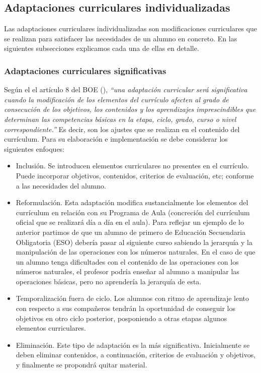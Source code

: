 \subsection{Adaptaciones curriculares individualizadas}

Las adaptaciones curriculares individualizadas son modificaciones curriculares que se realizan para satisfacer las necesidades de un alumno en concreto. En las siguientes subsecciones explicamos cada una de ellas en detalle.

\subsubsection{Adaptaciones curriculares significativas}
Según el el artículo 8 del BOE (\citeyear[p. 7]{BOE}), \textit{``una adaptación curricular será significativa cuando la modificación de los elementos del currículo afecten al grado de consecución de los objetivos, los contenidos y los aprendizajes imprescindibles que determinan las competencias básicas en la etapa, ciclo, grado, curso o nivel correspondiente.''} Es decir, son los ajustes que se realizan en el contenido del currículum. Para su elaboración e implementación se debe considerar los siguientes enfoques:
\begin{itemize}
    \item Inclusión. Se introducen elementos curriculares no presentes en el currículo. Puede incorporar objetivos, contenidos, criterios de evaluación, etc; conforme a las necesidades del alumno.
    \item Reformulación. Esta adaptación modifica sustancialmente los elementos del currículum en relación con su Programa de Aula (concreción del currículum oficial que se realizará día a día en el aula). Para reflejar un ejemplo de lo anterior partimos de que un alumno de primero de Educación Secuendaria Obligatoria (ESO) debería pasar al siguiente curso sabiendo la jerarquía y la manipulación de las operaciones con los números naturales. En el caso de que un alumno tenga dificultades con el contenido de las operaciones con los números naturales, el profesor podría enseñar al alumno a manipular las operaciones básicas, pero no aprendería la jerarquía de esta.

    \item Temporalización fuera de ciclo. Los alumnos con ritmo de aprendizaje lento con respecto a sus compañeros tendrán la oportunidad de conseguir los objetivos en otro ciclo posterior, posponiendo a otras etapas algunos elementos curriculares.
    \item Eliminación. Este tipo de adaptación es la más significativa. Inicialmente se deben eliminar contenidos, a continuación, criterios de evaluación y objetivos, y finalmente se propondrá quitar material.
\end{itemize}

